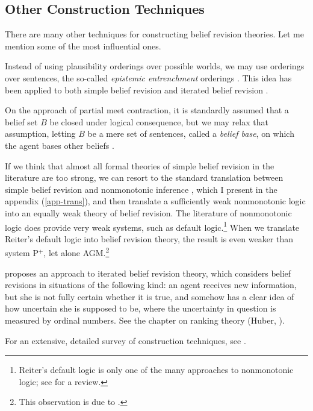 \subsection{Other Construction Techniques}\label{sec-other}

There are many other techniques for constructing belief revision theories. Let me mention some of the most influential ones.\op

	\im Instead of using plausibility orderings over possible worlds, we may use orderings over sentences, the so-called {\em epistemic entrenchment} orderings \citep{gardenfors1988revisions}. This idea has been applied to both simple belief revision and iterated belief revision \citep{nayak1994iterated}. 

	\im On the approach of partial meet contraction, it is standardly assumed that a belief set $B$ be closed under logical consequence, but we may relax that assumption, letting $B$ be a mere set of sentences, called a {\em belief base}, on which the agent bases other beliefs \citep{hansson1994taking,hansson1999textbook}. 

	\im If we think that almost all formal theories of simple belief revision in the literature are too strong, we can resort to the standard translation between simple belief revision and nonmonotonic inference \citep*{makinson1991relations}, which I present in the appendix (\autoref{app-trans}), and then translate a sufficiently weak nonmonotonic logic into an equally weak theory of belief revision. The literature of nonmonotonic logic does provide very weak systems, such as  default logic.\footnote
		{
		Reiter's default logic is only one of the many approaches to nonmonotonic logic; see \citet*{brewka2008nonmonotonic} for a review.
		}
	When we translate Reiter's default logic into belief revision theory, the result is even weaker than system P$^+$, let alone AGM.\footnote
		{
		This observation is due to \citet{makinson1988general}.
		}

	\im \citet{spohn1988ordinal} proposes an approach to iterated belief revision theory, which considers belief revisions in situations of the following kind: an agent receives new information, but she is not fully certain whether it is true, and somehow has a clear idea of how uncertain she is supposed to be, where the uncertainty in question is measured by ordinal numbers. See the chapter on ranking theory (Huber, ).

\ed For an extensive, detailed survey of construction techniques, see \citet*{rodrigues2011belief}.



